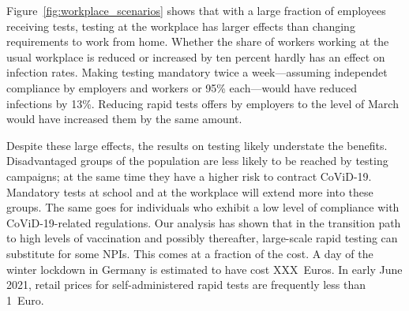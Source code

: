 Figure~\ref{fig:workplace_scenarios} shows that with a large fraction of employees receiving tests, testing at the workplace has larger effects than changing requirements to work from home. Whether the share of workers working at the usual workplace is reduced or increased by ten percent hardly has an effect on infection rates. Making testing mandatory twice a week---assuming independet compliance by employers and workers or 95\% each---would have reduced infections by 13\%. Reducing rapid tests offers by employers to the level of March would have increased them by the same amount. 

Despite these large effects, the results on testing likely understate the benefits. Disadvantaged groups of the population are less likely to be reached by testing campaigns; at the same time they have a higher risk to contract CoViD-19.\citet{RKI-Corona-Monitoring-Bundesweit} Mandatory tests at school and at the workplace will extend more into these groups. The same goes for individuals who exhibit a low level of compliance with CoViD-19-related regulations. Our analysis has shown that in the transition path to high levels of vaccination and possibly thereafter, large-scale rapid testing can substitute for some NPIs. This comes at a fraction of the cost. A day of the winter lockdown in Germany is estimated to have cost XXX~Euros. In early June 2021, retail prices for self-administered rapid tests are frequently less than 1~Euro.

